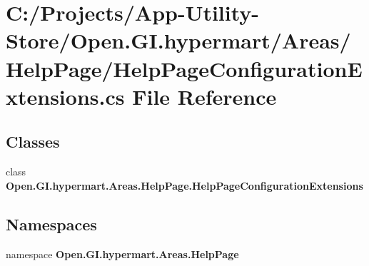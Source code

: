 \section{C\+:/\+Projects/\+App-\/\+Utility-\/\+Store/\+Open.G\+I.\+hypermart/\+Areas/\+Help\+Page/\+Help\+Page\+Configuration\+Extensions.cs File Reference}
\label{_help_page_configuration_extensions_8cs}
\subsection*{Classes}
\begin{DoxyCompactItemize}
\item 
class {\bfseries Open.\+G\+I.\+hypermart.\+Areas.\+Help\+Page.\+Help\+Page\+Configuration\+Extensions}
\end{DoxyCompactItemize}
\subsection*{Namespaces}
\begin{DoxyCompactItemize}
\item 
namespace \textbf{ Open.\+G\+I.\+hypermart.\+Areas.\+Help\+Page}
\end{DoxyCompactItemize}
